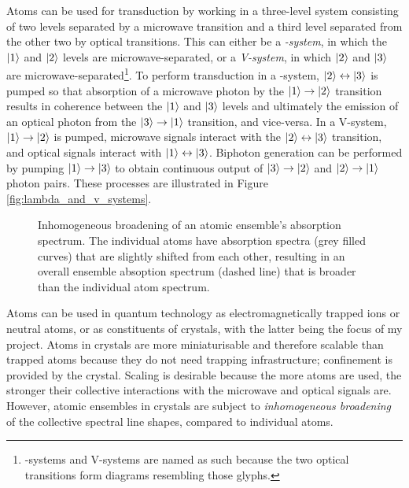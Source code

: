 \noindent Atoms can be used for transduction by working in a three-level system consisting of two levels separated by a microwave transition and a third level separated from the other two by optical transitions. This can either be a \textit{\textLambda-system}, in which the $\left|1\right\rangle$ and $\left|2\right\rangle$ levels are microwave-separated, or a \textit{V-system}, in which $\left|2\right\rangle$ and $\left|3\right\rangle$ are microwave-separated\footnote{\textLambda-systems and V-systems are named as such because the two optical transitions form diagrams resembling those glyphs.}. To perform transduction in a \textLambda-system, $\left|2\right\rangle\leftrightarrow\left|3\right\rangle$ is pumped so that absorption of a microwave photon by the $\left|1\right\rangle\to\left|2\right\rangle$ transition results in coherence between the $\left|1\right\rangle$ and $\left|3\right\rangle$ levels and ultimately the emission of an optical photon from the $\left|3\right\rangle\to\left|1\right\rangle$ transition, and vice-versa. In a V-system, $\left|1\right\rangle\to\left|2\right\rangle$ is pumped, microwave signals interact with the $\left|2\right\rangle\leftrightarrow\left|3\right\rangle$ transition, and optical signals interact with $\left|1\right\rangle\leftrightarrow\left|3\right\rangle$. Biphoton generation can be performed by pumping $\left|1\right\rangle\to\left|3\right\rangle$ to obtain continuous output of $\left|3\right\rangle\to\left|2\right\rangle$ and $\left|2\right\rangle\to\left|1\right\rangle$ photon pairs. These processes are illustrated in Figure \ref{fig:lambda_and_v_systems}.

\begin{figure}[h]
\centering

\caption{\label{fig:inhomogeneous_broadening} Inhomogeneous broadening of an atomic ensemble's absorption spectrum. The individual atoms have absorption spectra (grey filled curves) that are slightly shifted from each other, resulting in an overall ensemble absoption spectrum (dashed line) that is broader than the individual atom spectrum.}
\end{figure}

Atoms can be used in quantum technology as electromagnetically trapped ions or neutral atoms, or as constituents of crystals, with the latter being the focus of my project. Atoms in crystals are more miniaturisable and therefore scalable than trapped atoms because they do not need trapping infrastructure; confinement is provided by the crystal. Scaling is desirable because the more atoms are used, the stronger their collective interactions with the microwave and optical signals are. However, atomic ensembles in crystals are subject to \textit{inhomogeneous broadening} of the collective spectral line shapes, compared to individual atoms.

